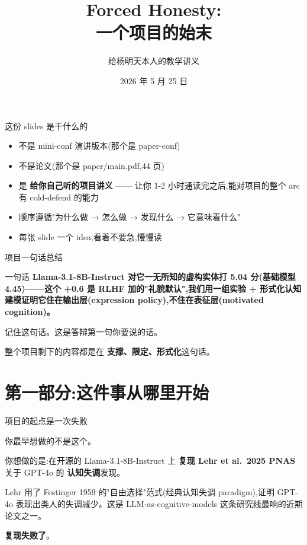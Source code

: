 \documentclass[aspectratio=169,11pt]{ctexbeamer}
\title{\textbf{Forced Honesty:\\ 一个项目的始末}}
\subtitle{给杨明天本人的教学讲义}
\author{}
\date{2026 年 5 月 25 日}
\newcommand{\hi}[1]{\textcolor{ow-red}{\textbf{#1}}}
\newcommand{\hib}[1]{\textcolor{ow-blue}{\textbf{#1}}}
\begin{document}
\maketitle

\begin{frame}{这份 slides 是干什么的}
\begin{itemize}
\item 不是 mini-conf 演讲版本(那个是 paper-conf)
\item 不是论文(那个是 paper/main.pdf,44 页)
\item 是 \hi{给你自己听的项目讲义} —— 让你 1-2 小时通读完之后,能对项目的整个 arc 有 cold-defend 的能力
\item 顺序遵循"为什么做 → 怎么做 → 发现什么 → 它意味着什么"
\item 每张 slide 一个 idea,看着不要急,慢慢读
\end{itemize}
\end{frame}

\begin{frame}{项目一句话总结}
\begin{block}{一句话}
\centering\large
\hi{Llama-3.1-8B-Instruct 对它一无所知的虚构实体打 5.04 分(基础模型 4.45)——这个 +0.6 是 RLHF 加的"礼貌默认",我们用一组实验 + 形式化认知建模证明它住在输出层(expression policy),不住在表征层(motivated cognition)。}
\end{block}
\bigskip

记住这句话。这是答辩第一句你要说的话。

整个项目剩下的内容都是在 \hib{支撑、限定、形式化}这句话。
\end{frame}

\section{第一部分:这件事从哪里开始}

\begin{frame}{项目的起点是一次失败}

你最早想做的不是这个。

\bigskip
你想做的是:在开源的 Llama-3.1-8B-Instruct 上 \hi{复现 Lehr et al.\ 2025 PNAS} 关于 GPT-4o 的 \hib{认知失调}发现。

\bigskip
Lehr 用了 Festinger 1959 的"自由选择"范式(经典认知失调 paradigm),证明 GPT-4o 表现出类人的失调减少。这是 LLM-as-cognitive-models 这条研究线最响的近期论文之一。

\bigskip
\hi{复现失败了}。
\end{frame}
\end{document}
